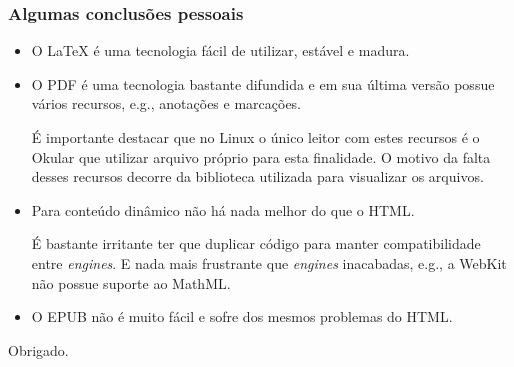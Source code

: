 \documentclass[]{beamer}
\begin{document}
\begin{frame}
    \frametitle{Algumas conclus\~{o}es pessoais}
    \begin{itemize}
        \item O LaTeX \'{e} uma tecnologia f\'{a}cil de utilizar, est\'{a}vel e madura.
            \pause
        \item O PDF \'{e} uma tecnologia bastante difundida e em sua \'{u}ltima vers\~{a}o possue v\'{a}rios recursos, e.g., anota\c{c}\~{o}es e marca\c{c}\~{o}es.
            \pause

            \'{E} importante destacar que no Linux o \'{u}nico leitor com estes recursos \'{e} o Okular que utilizar arquivo pr\'{o}prio para esta finalidade. O motivo da falta desses recursos decorre da biblioteca utilizada para visualizar os arquivos.
            \pause
        \item Para conte\'{u}do din\^{a}mico n\~{a}o h\'{a} nada melhor do que o HTML.
            \pause
            
            \'{E} bastante irritante ter que duplicar c\'{o}digo para manter compatibilidade entre \textit{engines}. E nada mais frustrante que \textit{engines} inacabadas, e.g., a WebKit n\~{a}o possue suporte ao MathML.
            \pause
        \item O EPUB n\~{a}o \'{e} muito f\'{a}cil e sofre dos mesmos problemas do HTML.
    \end{itemize}
\end{frame}

\begin{frame}
    Obrigado.
\end{frame}
\end{document}
